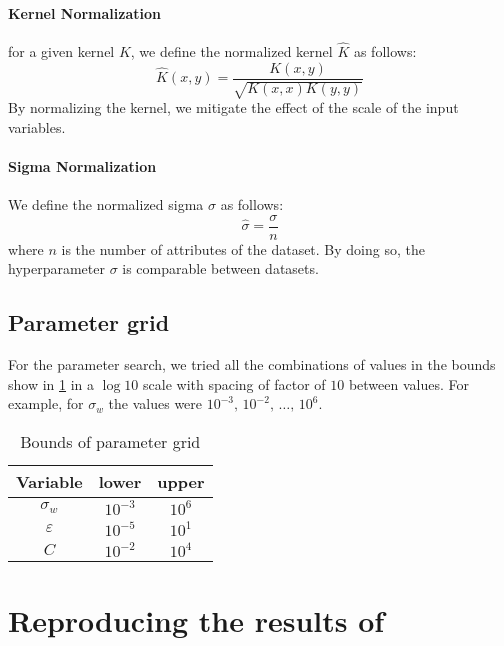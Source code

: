 \paragraph{Kernel Normalization} for a given kernel $K$, we define the
normalized kernel $\hat{K}$ as follows:
\begin{equation}
    \hat{K}(x, y) = \frac{K(x, y)}{\sqrt{K(x, x)K(y, y)}}
\end{equation}
By normalizing the kernel, we mitigate the effect of the scale of the
input variables. %

\paragraph{Sigma Normalization} We define the normalized sigma $\hat{\sigma}$
as follows:
\begin{equation}
    \hat{\sigma} = \frac{\sigma}{n}
\end{equation}
where $n$ is the number of attributes of the dataset. By doing so, the
hyperparameter $\sigma$ is comparable between datasets.

\subsection{Parameter grid}

For the parameter search, we tried all the combinations of values in the bounds
show in \cref{tab:paramgrid} in a $\log 10$ scale with spacing of factor of $10$
between values. For example, for $\sigma_w$ the values were
$10^{-3},\,10^{-2},\,\dots,\,10^{6}$.

\begin{table}[H]
    \caption{Bounds of parameter grid}%
    \label{tab:paramgrid}
    \begin{tabular}{ccc}
        \toprule
        Variable      & lower     & upper  \\
        \midrule
        $\sigma_w$    & $10^{-3}$ & $10^6$ \\
        $\varepsilon$ & $10^{-5}$ & $10^1$ \\
        $C$           & $10^{-2}$ & $10^4$ \\
        \bottomrule
    \end{tabular}
\end{table}

\section{Reproducing the results of \texorpdfstring{\citeauthor{frenayParameterinsensitiveKernelExtreme2011}}{Frénay and Verleysen}}
\label{sec:reproducing-frenay}

